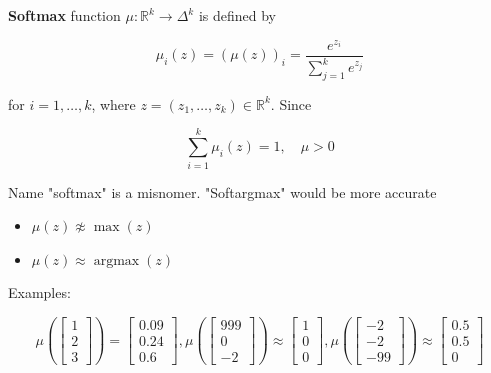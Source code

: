 \documentclass{report}
\begin{document}
\begin{definition}
    \textbf{Softmax} function $\mu: \mathbb{R}^{k} \rightarrow \Delta^{k}$ is defined by

    $$
    \mu_{i}(z)=(\mu(z))_{i}=\frac{e^{z_{i}}}{\sum_{j=1}^{k} e^{z_{j}}}
    $$

    for $i=1, \ldots, k$, where $z=\left(z_{1}, \ldots, z_{k}\right) \in \mathbb{R}^{k}$. Since

    $$
    \sum_{i=1}^{k} \mu_{i}(z)=1, \quad \mu>0
    $$

    Name "softmax" is a misnomer. "Softargmax" would be more accurate

    \begin{itemize}
        \item $\mu(z) \not \approx \max (z)$
        \item $\mu(z) \approx \operatorname{argmax}(z)$
    \end{itemize}

    Examples:

    $$
    \mu\left(\left[\begin{array}{l}
    1 \\
    2 \\
    3
    \end{array}\right]\right)=\left[\begin{array}{l}
    0.09 \\
    0.24 \\
    0.6
    \end{array}\right],
    \mu\left(\left[\begin{array}{c}
    999 \\
    0 \\
    -2
    \end{array}\right]\right) \approx\left[\begin{array}{l}
    1 \\
    0 \\
    0
    \end{array}\right],
    \mu\left(\left[\begin{array}{c}
    -2 \\
    -2 \\
    -99
    \end{array}\right]\right) \approx\left[\begin{array}{c}
    0.5 \\
    0.5 \\
    0
    \end{array}\right]
    $$
\end{definition}
\end{document}
